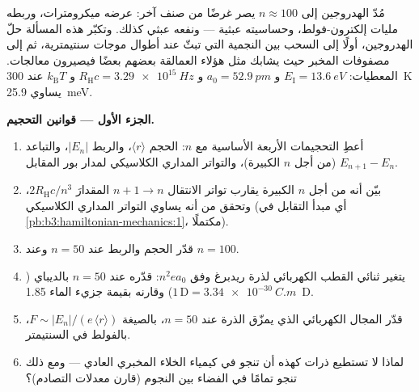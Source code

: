 \begin{problem}\label{pb:b3:hydrogen-atom:1}
مُدّ الهدروجين إلى $n \approx 100$ يصر غرضًا من صنف آخر:
عرضه ميكرومترات، وربطه مليات إلكترون-فولط، وحساسيته
عبثية --- ونفعه عبثي كذلك. وتكبّر هذه المسألة
حلّ الهدروجين، أولًا إلى السحب بين النجمية التي تبثّ
عند أطوال موجات سنتيمترية، ثم إلى مصفوفات المخبر
حيث يشابك مثل هؤلاء العمالقة بعضهم بعضًا فيصيرون معالجات. المعطيات:
$E_{\text{I}} = \qty{13.6}{eV}$ و $a_0 = \qty{52.9}{pm}$ و
$R_{\text{H}}c = \qty{3.29e15}{Hz}$ و $k_{\text{B}}T$ عند
\qty{300}{K} يساوي \qty{25.9}{meV}.

\medskip\noindent\textbf{الجزء الأول --- قوانين التحجيم.}
\begin{enumerate}
  \item أعطِ التحجيمات الأربعة الأساسية مع $n$: الحجم $\langle
        r\rangle$، والربط $|E_n|$، والتباعد $E_{n+1} - E_n$ (من أجل
        $n$ الكبيرة)، والتواتر المداري الكلاسيكي لمدار
        بور المقابل.
  \item بيّن أنه من أجل $n$ الكبيرة يقارب تواتر الانتقال $n+1 \to
        n$ المقدارَ $2R_{\text{H}}c/n^3$، وتحقق من أنه يساوي
        التواتر المداري الكلاسيكي (أي مبدأ
        التقابل في \cref{pb:b3:hamiltonian-mechanics:1}،
        مكتملًا).
  \item قدّر الحجم والربط عند $n = 50$ وعند $n = 100$.
  \item يتغير ثنائي القطب الكهربائي لذرة ريدبرغ وفق $n^2ea_0$:
        قدّره عند $n = 50$ بالديباي ($1\,\text{D} =
        \qty{3.34e-30}{C.m}$) وقارنه بقيمة جزيء الماء
        \qty{1.85}{D}.
  \item قدّر المجال الكهربائي الذي يمزّق الذرة عند $n = 50$،
        بالصيغة $F \sim |E_n|/(e\,\langle r\rangle)$، بالفولط في السنتيمتر.
  \item لماذا لا تستطيع ذرات كهذه أن تنجو في كيمياء الخلاء
        المخبري العادي --- ومع ذلك تنجو تمامًا في الفضاء بين النجوم
        (قارن معدلات التصادم)؟
\end{enumerate}


\end{problem}
